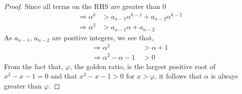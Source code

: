 \begin{multicols}{2}
\begin{proof}
Since all terms on the RHS are greater than 0
\begin{align}
\Rightarrow \alpha^{k} &>  a_{n-1}\alpha^{k-1} + a_{n-2}\alpha^{k-2}\nonumber \\
\Rightarrow \alpha^{2} &>  a_{n-1}\alpha + a_{n-2}\nonumber
\end{align}
As $a_{n-1}$, $a_{n-2}$ are positive integers, we see that,
\begin{align}
\Rightarrow \alpha^{2} &>  \alpha + 1\nonumber\\
\label{alphaphicompare}\Rightarrow \alpha^{2} -  \alpha - 1\ &> 0
\end{align}
From the fact that, $\varphi$, the golden ratio, is the largest positive root of $x^2-x-1 = 0$ and that $x^2-x-1 > 0$ for $x > \varphi$, it follows that
$\alpha$ is always greater than $\varphi$.
\end{proof}


\end{multicols}
